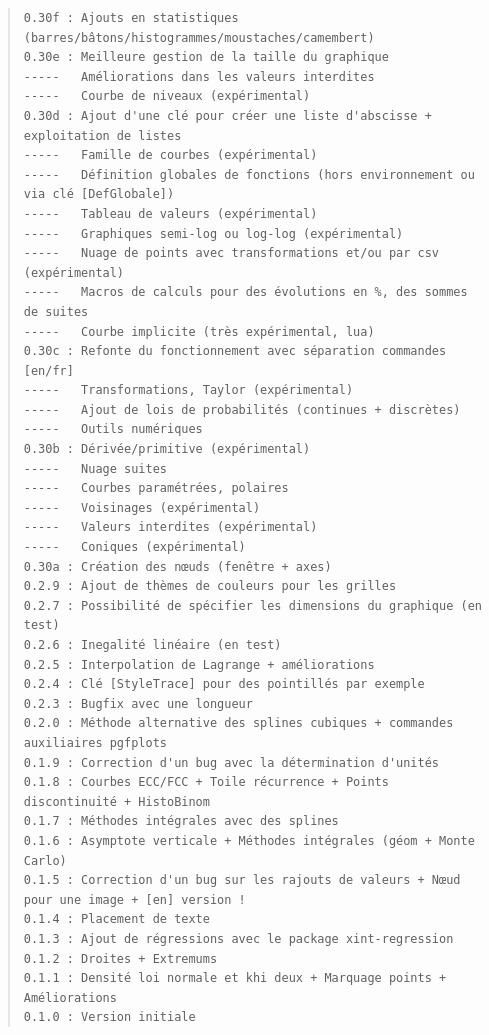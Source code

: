 \documentclass[11pt,a4paper]{ltxdoc}
\begin{document}
{\footnotesize \begin{quote}
\begin{verbatim}
0.30f : Ajouts en statistiques (barres/bâtons/histogrammes/moustaches/camembert)
0.30e : Meilleure gestion de la taille du graphique
-----   Améliorations dans les valeurs interdites
-----   Courbe de niveaux (expérimental)
0.30d : Ajout d'une clé pour créer une liste d'abscisse + exploitation de listes
-----   Famille de courbes (expérimental)
-----   Définition globales de fonctions (hors environnement ou via clé [DefGlobale])
-----   Tableau de valeurs (expérimental)
-----   Graphiques semi-log ou log-log (expérimental)
-----   Nuage de points avec transformations et/ou par csv (expérimental)
-----   Macros de calculs pour des évolutions en %, des sommes de suites
-----   Courbe implicite (très expérimental, lua)
0.30c : Refonte du fonctionnement avec séparation commandes [en/fr]
-----   Transformations, Taylor (expérimental)
-----   Ajout de lois de probabilités (continues + discrètes)
-----   Outils numériques
0.30b : Dérivée/primitive (expérimental)
-----   Nuage suites
-----   Courbes paramétrées, polaires
-----   Voisinages (expérimental)
-----   Valeurs interdites (expérimental)
-----   Coniques (expérimental)
0.30a : Création des nœuds (fenêtre + axes)
0.2.9 : Ajout de thèmes de couleurs pour les grilles
0.2.7 : Possibilité de spécifier les dimensions du graphique (en test)
0.2.6 : Inegalité linéaire (en test)
0.2.5 : Interpolation de Lagrange + améliorations
0.2.4 : Clé [StyleTrace] pour des pointillés par exemple
0.2.3 : Bugfix avec une longueur
0.2.0 : Méthode alternative des splines cubiques + commandes auxiliaires pgfplots
0.1.9 : Correction d'un bug avec la détermination d'unités
0.1.8 : Courbes ECC/FCC + Toile récurrence + Points discontinuité + HistoBinom
0.1.7 : Méthodes intégrales avec des splines
0.1.6 : Asymptote verticale + Méthodes intégrales (géom + Monte Carlo)
0.1.5 : Correction d'un bug sur les rajouts de valeurs + Nœud pour une image + [en] version !
0.1.4 : Placement de texte
0.1.3 : Ajout de régressions avec le package xint-regression
0.1.2 : Droites + Extremums
0.1.1 : Densité loi normale et khi deux + Marquage points + Améliorations
0.1.0 : Version initiale
\end{verbatim}
\end{quote}}
\end{document}
